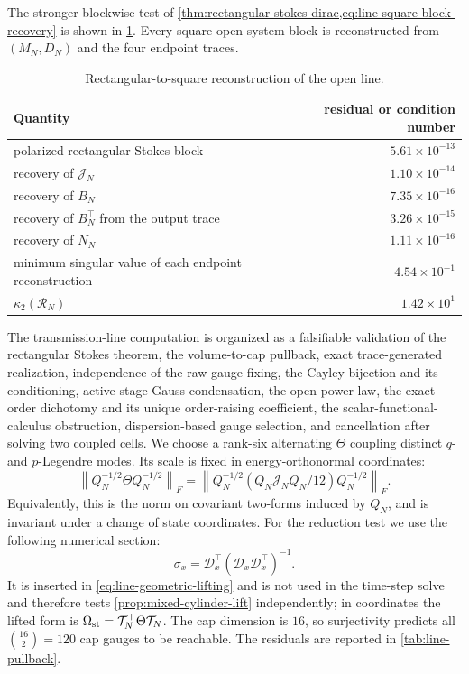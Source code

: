 \documentclass[11pt,a4paper]{article}
\newcommand{\norm}[1]{\left\lVert #1\right\rVert}
\begin{document}
The stronger blockwise test of
\cref{thm:rectangular-stokes-dirac,eq:line-square-block-recovery} is shown
in \cref{tab:rectangular-reconstruction}.  Every square open-system block
is reconstructed from \((M_N,D_N)\) and the four endpoint traces.

\begin{table}[H]
\centering
\caption{Rectangular-to-square reconstruction of the open line.}
\label{tab:rectangular-reconstruction}
\begin{tabular}{@{}lr@{}}
\toprule
Quantity & residual or condition number \\ \midrule
polarized rectangular Stokes block & \(5.61\times10^{-13}\)\\
recovery of \(\mathcal J_N\) & \(1.10\times10^{-14}\)\\
recovery of \(B_N\) & \(7.35\times10^{-16}\)\\
recovery of \(B_N^\top\) from the output trace & \(3.26\times10^{-15}\)\\
recovery of \(N_N\) & \(1.11\times10^{-16}\)\\
minimum singular value of each endpoint reconstruction
& \(4.54\times10^{-1}\)\\
\(\kappa_2(\mathcal R_N)\) & \(1.42\times10^{1}\)\\
\bottomrule
\end{tabular}
\end{table}

The transmission-line computation is organized as a falsifiable
validation of the rectangular Stokes theorem, the volume-to-cap pullback,
exact trace-generated realization, independence of the raw gauge fixing,
the Cayley bijection and its conditioning, active-stage Gauss
condensation, the open power law, the exact order dichotomy and its unique
order-raising coefficient, the scalar-functional-calculus obstruction,
dispersion-based gauge selection, and cancellation after solving two
coupled cells.  We choose a rank-six alternating \(\Theta\)
coupling distinct \(q\)- and \(p\)-Legendre modes.  Its scale is fixed in
energy-orthonormal coordinates:
\begin{equation}\label{eq:intrinsic-theta-normalization}
 \norm{Q_N^{-1/2}\Theta Q_N^{-1/2}}_F
 =\norm{Q_N^{-1/2}
 (Q_N\mathcal J_NQ_N/12)Q_N^{-1/2}}_F.
\end{equation}
Equivalently, this is the norm on covariant two-forms induced by \(Q_N\),
and is invariant under a change of state coordinates.
For the reduction test we use the following numerical section:
\[
 \sigma_x=\mathcal D_x^\top
 (\mathcal D_x\mathcal D_x^\top)^{-1}
 .
\]
It is inserted in \cref{eq:line-geometric-lifting} and is not used in the
time-step solve and therefore tests \cref{prop:mixed-cylinder-lift}
independently; in coordinates the lifted form is
\(\Omega_{\rm st}=\mathcal T_N^\top\Theta\mathcal T_N\).
The cap dimension is \(16\), so surjectivity predicts all
\(\binom{16}{2}=120\) cap gauges to be reachable.  The residuals are
reported in \cref{tab:line-pullback}.
\end{document}
